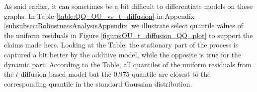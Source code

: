 As said earlier, it can sometimes be a bit difficult to differentiate models on these graphs. In Table \ref{table:QQ_OU_vs_t_diffusion} in Appendix \ref{subsubsec:RobustnessAnalysisAppendix} we illustrate select quantile values of the uniform residuals in Figure \ref{figure:OU_t_diffusion_QQ_plot} to support the claims made here. Looking at the Table, the stationary part of the process is captured a bit better by the additive model, while the opposite is true for the dynamic part. According to the Table, all quantiles of the uniform residuals from the $t$-diffusion-based model but the $0.975$-quantile are closest to the corresponding quantile in the standard Gaussian distribution.
